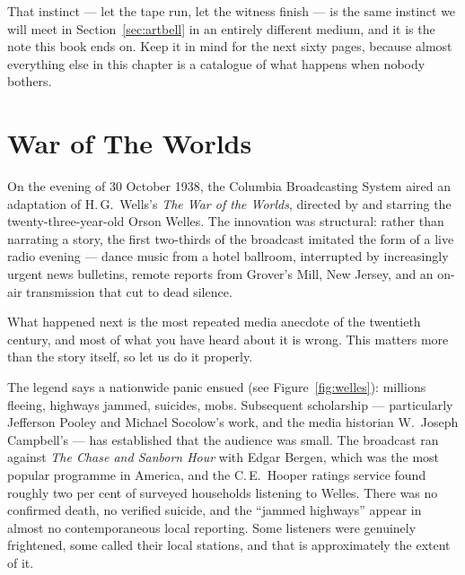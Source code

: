 
That instinct --- let the tape run, let the witness finish --- is the same instinct we will meet in
Section~\ref{sec:artbell} in an entirely different medium, and it is the note this book ends on. Keep
it in mind for the next sixty pages, because almost everything else in this chapter is a catalogue of
what happens when nobody bothers.

\section{War of The Worlds}\label{sec:warworlds}

On the evening of 30 October 1938, the Columbia Broadcasting System aired an adaptation of H.\,G.\
Wells's \emph{The War of the Worlds}, directed by and starring the twenty-three-year-old Orson Welles.
The innovation was structural: rather than narrating a story, the first two-thirds of the broadcast
imitated the form of a live radio evening --- dance music from a hotel ballroom, interrupted by
increasingly urgent news bulletins, remote reports from Grover's Mill, New Jersey, and an on-air
transmission that cut to dead silence.

What happened next is the most repeated media anecdote of the twentieth century, and most of what you
have heard about it is wrong. This matters more than the story itself, so let us do it properly.

The legend says a nationwide panic ensued (see Figure~\ref{fig:welles}): millions fleeing, highways jammed, suicides, mobs.
Subsequent scholarship --- particularly Jefferson Pooley and Michael Socolow's work, and the media
historian W.\ Joseph Campbell's --- has established that the audience was small. The broadcast ran
against \emph{The Chase and Sanborn Hour} with Edgar Bergen, which was the most popular programme in
America, and the C.\,E.\ Hooper ratings service found roughly two per cent of surveyed households
listening to Welles. There was no confirmed death, no verified suicide, and the ``jammed highways''
appear in almost no contemporaneous local reporting. Some listeners were genuinely frightened, some
called their local stations, and that is approximately the extent of it.

